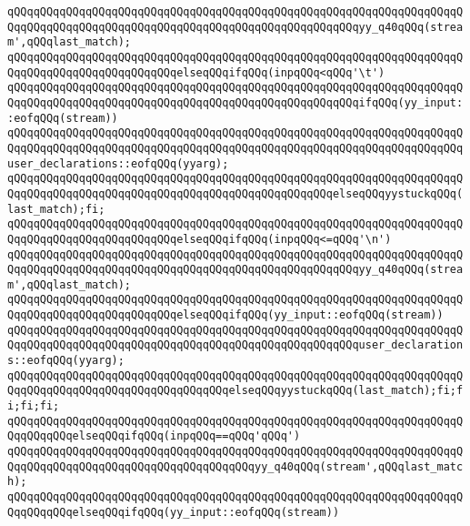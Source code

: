 \verb|qQQqqQQqqQQqqQQqqQQqqQQqqQQqqQQqqQQqqQQqqQQqqQQqqQQqqQQqqQQqqQQqqQQqqQQqqQQqqQQqqQQqqQQqqQQqqQQqqQQqqQQqqQQqqQQqqQQqqQQqqQQqyy_q40qQQq(stream',qQQqlast_match);|\newline
\verb|qQQqqQQqqQQqqQQqqQQqqQQqqQQqqQQqqQQqqQQqqQQqqQQqqQQqqQQqqQQqqQQqqQQqqQQqqQQqqQQqqQQqqQQqqQQqqQQqelseqQQqifqQQq(inpqQQq<qQQq'\t')|\newline
\verb|qQQqqQQqqQQqqQQqqQQqqQQqqQQqqQQqqQQqqQQqqQQqqQQqqQQqqQQqqQQqqQQqqQQqqQQqqQQqqQQqqQQqqQQqqQQqqQQqqQQqqQQqqQQqqQQqqQQqqQQqqQQqifqQQq(yy_input::eofqQQq(stream))|\newline
\verb|qQQqqQQqqQQqqQQqqQQqqQQqqQQqqQQqqQQqqQQqqQQqqQQqqQQqqQQqqQQqqQQqqQQqqQQqqQQqqQQqqQQqqQQqqQQqqQQqqQQqqQQqqQQqqQQqqQQqqQQqqQQqqQQqqQQqqQQqqQQquser_declarations::eofqQQq(yyarg);|\newline
\verb|qQQqqQQqqQQqqQQqqQQqqQQqqQQqqQQqqQQqqQQqqQQqqQQqqQQqqQQqqQQqqQQqqQQqqQQqqQQqqQQqqQQqqQQqqQQqqQQqqQQqqQQqqQQqqQQqqQQqqQQqelseqQQqyystuckqQQq(last_match);fi;|\newline
\verb|qQQqqQQqqQQqqQQqqQQqqQQqqQQqqQQqqQQqqQQqqQQqqQQqqQQqqQQqqQQqqQQqqQQqqQQqqQQqqQQqqQQqqQQqqQQqqQQqelseqQQqifqQQq(inpqQQq<=qQQq'\n')|\newline
\verb|qQQqqQQqqQQqqQQqqQQqqQQqqQQqqQQqqQQqqQQqqQQqqQQqqQQqqQQqqQQqqQQqqQQqqQQqqQQqqQQqqQQqqQQqqQQqqQQqqQQqqQQqqQQqqQQqqQQqqQQqqQQqyy_q40qQQq(stream',qQQqlast_match);|\newline
\verb|qQQqqQQqqQQqqQQqqQQqqQQqqQQqqQQqqQQqqQQqqQQqqQQqqQQqqQQqqQQqqQQqqQQqqQQqqQQqqQQqqQQqqQQqqQQqqQQqelseqQQqifqQQq(yy_input::eofqQQq(stream))|\newline
\verb|qQQqqQQqqQQqqQQqqQQqqQQqqQQqqQQqqQQqqQQqqQQqqQQqqQQqqQQqqQQqqQQqqQQqqQQqqQQqqQQqqQQqqQQqqQQqqQQqqQQqqQQqqQQqqQQqqQQqqQQqqQQquser_declarations::eofqQQq(yyarg);|\newline
\verb|qQQqqQQqqQQqqQQqqQQqqQQqqQQqqQQqqQQqqQQqqQQqqQQqqQQqqQQqqQQqqQQqqQQqqQQqqQQqqQQqqQQqqQQqqQQqqQQqqQQqqQQqelseqQQqyystuckqQQq(last_match);fi;fi;fi;fi;|\newline
\verb|qQQqqQQqqQQqqQQqqQQqqQQqqQQqqQQqqQQqqQQqqQQqqQQqqQQqqQQqqQQqqQQqqQQqqQQqqQQqqQQqelseqQQqifqQQq(inpqQQq==qQQq'qQQq')|\newline
\verb|qQQqqQQqqQQqqQQqqQQqqQQqqQQqqQQqqQQqqQQqqQQqqQQqqQQqqQQqqQQqqQQqqQQqqQQqqQQqqQQqqQQqqQQqqQQqqQQqqQQqqQQqqQQqyy_q40qQQq(stream',qQQqlast_match);|\newline
\verb|qQQqqQQqqQQqqQQqqQQqqQQqqQQqqQQqqQQqqQQqqQQqqQQqqQQqqQQqqQQqqQQqqQQqqQQqqQQqqQQqelseqQQqifqQQq(yy_input::eofqQQq(stream))|\newline
